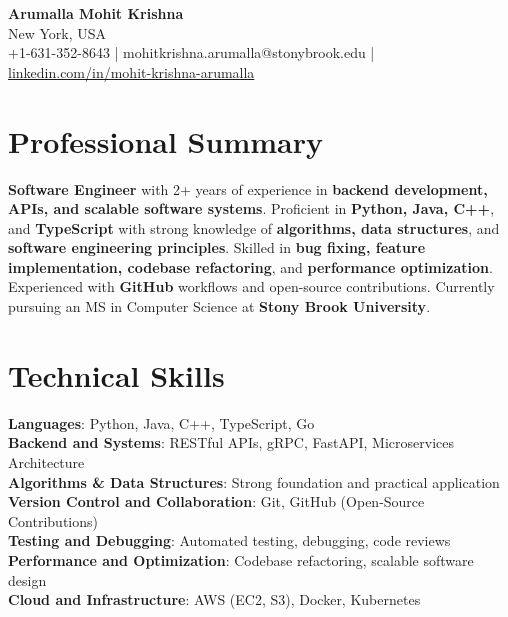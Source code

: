 \documentclass[letterpaper,11pt]{article}
\begin{document}
\begin{center}
  {\Large \textbf{Arumalla Mohit Krishna}} \\
  New York, USA \\
  +1-631-352-8643 \enspace | \enspace mohitkrishna.arumalla@stonybrook.edu \enspace | \enspace \href{https://www.linkedin.com/in/mohit-krishna-arumalla}{linkedin.com/in/mohit-krishna-arumalla}
\end{center}

\section{Professional Summary}
  \begin{itemize}[leftmargin=0.15in, label={}]
    \small{\item{
     \textbf{Software Engineer} with 2+ years of experience in \textbf{backend development, APIs, and scalable software systems}. Proficient in \textbf{Python, Java, C++}, and \textbf{TypeScript} with strong knowledge of \textbf{algorithms, data structures}, and \textbf{software engineering principles}. Skilled in \textbf{bug fixing, feature implementation, codebase refactoring}, and \textbf{performance optimization}. Experienced with \textbf{GitHub} workflows and open-source contributions. Currently pursuing an MS in Computer Science at \textbf{Stony Brook University}.
    }}
  \end{itemize}
\vspace{-16pt}

\section{Technical Skills}
 \begin{itemize}[leftmargin=0.15in, label={}]
    \small{\item{
     \textbf{Languages}: Python, Java, C++, TypeScript, Go \\
     \textbf{Backend and Systems}: RESTful APIs, gRPC, FastAPI, Microservices Architecture \\
     \textbf{Algorithms \& Data Structures}: Strong foundation and practical application \\
     \textbf{Version Control and Collaboration}: Git, GitHub (Open-Source Contributions) \\
     \textbf{Testing and Debugging}: Automated testing, debugging, code reviews \\
     \textbf{Performance and Optimization}: Codebase refactoring, scalable software design \\
     \textbf{Cloud and Infrastructure}: AWS (EC2, S3), Docker, Kubernetes \\
    }}
 \end{itemize}
\vspace{-16pt}
\end{document}
